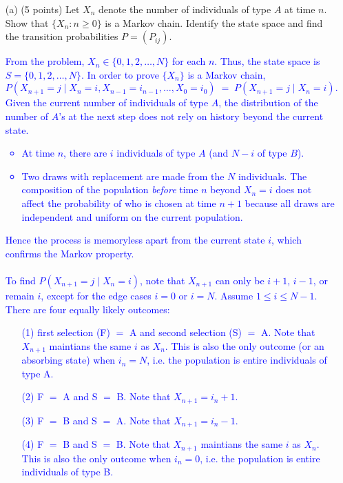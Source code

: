 \documentclass{article}
\begin{document}
\begin{enumerate}
    \item[(a)] (5 points) Let $X_n$ denote the number of individuals of type $A$ at time $n$. Show that $\{X_n : n \geq 0\}$ is a Markov chain. Identify the state space and find the transition probabilities $P = (P_{ij})$. \\ 
        \textcolor{blue}{From the problem, $X_n \in \{0,1,2,\ldots,N\} $ for each $n$. Thus, the state space is $S = \{0,1,2,\ldots,N\}$.
In order to prove $\{X_n\}$ is a Markov chain,
\[
P(X_{n+1} = j \mid X_n = i, X_{n-1} = i_{n-1}, \ldots, X_0 = i_0)
\;=\;
P(X_{n+1} = j \mid X_n = i).
\]
Given the current number of individuals of type $A$, the distribution of the number of $A$'s at the next step does not rely on history beyond the current state. 
\begin{itemize}
    \item At time $n$, there are $i$ individuals of type $A$ (and $N - i$ of type $B$).
    \item Two draws with replacement are made from the $N$ individuals. The composition of the population \textit{before} time $n$ beyond $X_n = i$ does not affect the probability of who is chosen at time $n+1$ because all draws are independent and uniform on the current population.
\end{itemize}
Hence the process is memoryless apart from the current state $i$, which confirms the Markov property. \\ \\ 
To find $P(X_{n+1} = j \mid X_n = i)$, note that $X_{n+1}$ can only be $i+1$, $i-1$, or remain $i$, except for the edge cases $i=0$ or $i=N$. Assume $1 \le i \le N-1$. There are four equally likely outcomes:
\begin{itemize}
    \item[(1)] first selection (F) $=$ A and second selection (S) $=$ A. Note that $X_{n+1}$ maintians the same $i$ as $X_n$. This is also the only outcome (or an absorbing state) when $i_n=N$, i.e. the population is entire individuals of type A.
    \item[(2)] F $=$ A and S $=$ B. Note that $X_{n+1} = i_n + 1$.
    \item[(3)] F $=$ B and S $=$ A. Note that $X_{n+1} = i_n - 1$.
    \item[(4)] F $=$ B and S $=$ B. Note that $X_{n+1}$ maintians the same $i$ as $X_n$. This is also the only outcome when $i_n=0$, i.e. the population is entire individuals of type B.
\end{itemize}
}
\end{enumerate}
\end{document}
